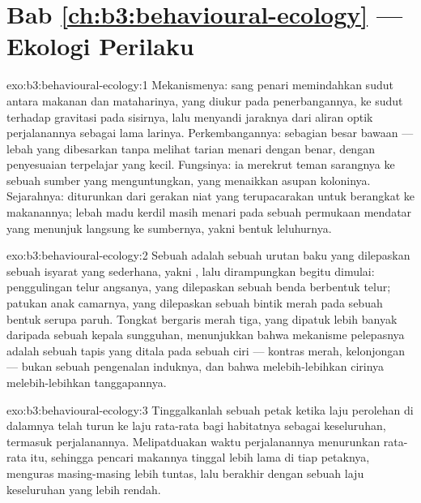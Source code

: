 \section*{Bab \ref{ch:b3:behavioural-ecology} --- Ekologi Perilaku}

\begin{solution}{exo:b3:behavioural-ecology:1}
Mekanismenya: sang penari memindahkan sudut antara makanan dan mataharinya,
yang diukur pada penerbangannya, ke sudut terhadap gravitasi pada sisirnya, lalu
menyandi jaraknya dari aliran optik perjalanannya sebagai lama
larinya. Perkembangannya: sebagian besar bawaan --- lebah yang dibesarkan tanpa melihat
tarian menari dengan benar, dengan penyesuaian terpelajar yang kecil. Fungsinya: ia
merekrut teman sarangnya ke sebuah sumber yang menguntungkan, yang menaikkan asupan koloninya.
Sejarahnya: diturunkan dari gerakan niat yang terupacarakan untuk berangkat ke
makanannya; lebah madu kerdil masih menari pada sebuah permukaan mendatar yang menunjuk
langsung ke sumbernya, yakni bentuk leluhurnya.
\end{solution}

\begin{solution}{exo:b3:behavioural-ecology:2}
Sebuah  adalah sebuah urutan baku yang dilepaskan sebuah isyarat yang
sederhana, yakni , lalu dirampungkan begitu dimulai: penggulingan telur
angsanya, yang dilepaskan sebuah benda berbentuk telur; patukan anak camarnya,
yang dilepaskan sebuah bintik merah pada sebuah bentuk serupa paruh. Tongkat bergaris merah
tiga, yang dipatuk lebih banyak daripada sebuah kepala sungguhan, menunjukkan bahwa mekanisme
pelepasnya adalah sebuah tapis yang ditala pada sebuah ciri --- kontras merah, kelonjongan ---
bukan sebuah pengenalan induknya, dan bahwa melebih-lebihkan cirinya
melebih-lebihkan tanggapannya.
\end{solution}

\begin{solution}{exo:b3:behavioural-ecology:3}
Tinggalkanlah sebuah petak ketika laju perolehan di dalamnya telah turun ke laju
rata-rata bagi habitatnya sebagai keseluruhan, termasuk perjalanannya. Melipatduakan waktu
perjalanannya menurunkan rata-rata itu, sehingga pencari makannya tinggal lebih lama di tiap petaknya,
menguras masing-masing lebih tuntas, lalu berakhir dengan sebuah laju keseluruhan yang lebih rendah.
\end{solution}

